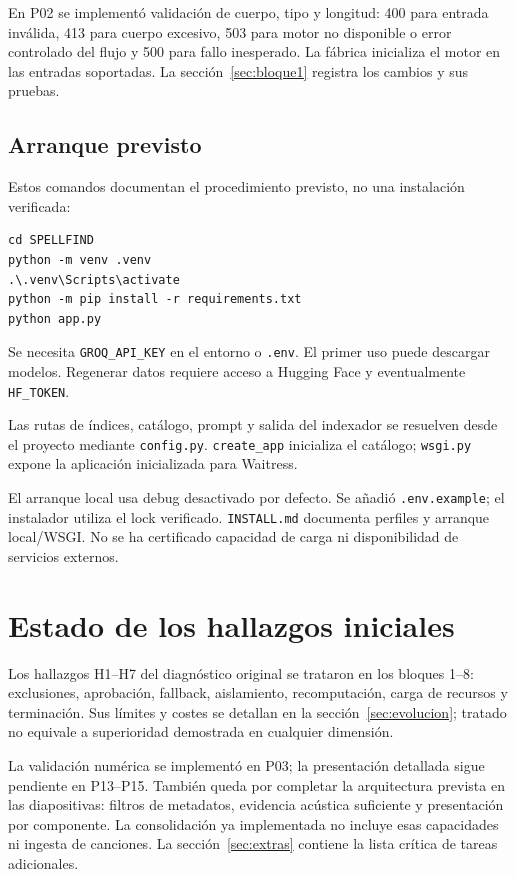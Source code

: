 \documentclass[11pt,a4paper]{article}
\newcommand{\code}[1]{\nolinkurl{#1}}
\begin{document}
En P02 se implementó validación de cuerpo, tipo y longitud: 400 para entrada inválida, 413 para cuerpo excesivo, 503 para motor no disponible o error controlado del flujo y 500 para fallo inesperado. La fábrica inicializa el motor en las entradas soportadas. La sección~\ref{sec:bloque1} registra los cambios y sus pruebas.

\subsection{Arranque previsto}
Estos comandos documentan el procedimiento previsto, no una instalación verificada:
\begin{verbatim}
cd SPELLFIND
python -m venv .venv
.\.venv\Scripts\activate
python -m pip install -r requirements.txt
python app.py
\end{verbatim}
Se necesita \code{GROQ_API_KEY} en el entorno o \code{.env}. El primer uso puede descargar modelos. Regenerar datos requiere acceso a Hugging Face y eventualmente \code{HF_TOKEN}.

Las rutas de índices, catálogo, prompt y salida del indexador se resuelven desde el proyecto mediante \code{config.py}. \code{create_app} inicializa el catálogo; \code{wsgi.py} expone la aplicación inicializada para Waitress.

El arranque local usa debug desactivado por defecto. Se añadió \code{.env.example}; el instalador utiliza el lock verificado. \code{INSTALL.md} documenta perfiles y arranque local/WSGI. No se ha certificado capacidad de carga ni disponibilidad de servicios externos.

\section{Estado de los hallazgos iniciales}
Los hallazgos H1--H7 del diagnóstico original se trataron en los bloques 1--8:
exclusiones, aprobación, fallback, aislamiento, recomputación, carga de recursos
y terminación. Sus límites y costes se detallan en la sección~\ref{sec:evolucion};
tratado no equivale a superioridad demostrada en cualquier dimensión.

La validación numérica se implementó en P03; la presentación detallada sigue pendiente en P13--P15. También
queda por completar la arquitectura prevista en las diapositivas: filtros de
metadatos, evidencia acústica suficiente y presentación por componente. La
consolidación ya implementada no incluye esas capacidades ni ingesta de canciones.
La sección~\ref{sec:extras} contiene la lista crítica de tareas adicionales.
\end{document}
